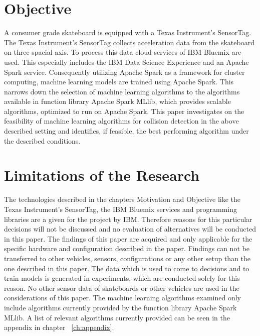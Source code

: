 \section{Objective}
A consumer grade skateboard is equipped with a Texas Instrument’s SensorTag. The Texas Instrument’s SensorTag collects acceleration data from the skateboard on three spacial axis. To process this data cloud services of IBM Bluemix are used. This especially includes the IBM Data Science Experience and an Apache Spark service. Consequently utilizing Apache Spark as a framework for cluster computing, machine learning models are trained using Apache Spark. This narrows down the selection of machine learning algorithms to the algorithms available in function library Apache Spark MLlib, which provides scalable algorithms, optimized to run on Apache Spark. 
\newline
This paper investigates on the feasibility of machine learning algorithms for collision detection in the above described setting and identifies, if feasible, the best performing algorithm under the described conditions.  

\section{Limitations of the Research}
The technologies described in the chapters Motivation and Objective like the Texas Instrument’s SensorTag, the IBM Bluemix services and programming libraries are a given for the project by IBM. Therefore reasons for this particular decisions will not be discussed and no evaluation of alternatives will be conducted in this paper.
The findings of this paper are acquired and only applicable for the specific hardware and configuration described in the paper. Findings can not be transferred to other vehicles, sensors, configurations or any other setup than the one described in this paper.
The data which is used to come to decisions and to train models is generated in experiments, which are conducted solely for this reason. No other sensor data of skateboards or other vehicles are used in the considerations of this paper.
The machine learning algorithms examined only include algorithms currently provided by the function library Apache Spark MLlib. A list of relevant algorithms currently provided can be seen in the appendix in chapter ~\ref{ch:appendix}.

